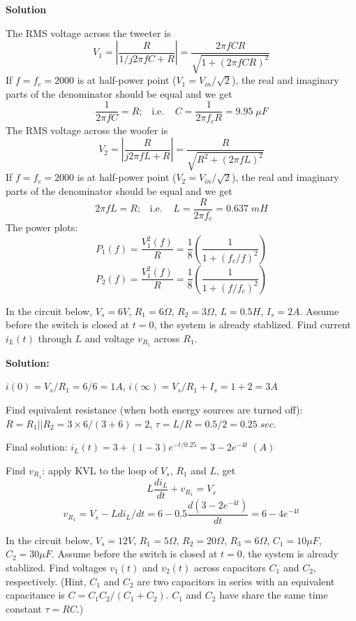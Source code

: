 \begin{enumerate}
   {\bf Solution}
   
   The RMS voltage across the tweeter is
   \[	V_1=|\frac{R}{1/j2\pi f C+R}|
   	=\frac{2\pi f CR}{\sqrt{1+(2\pi f CR)^2}}	\]
   If $f=f_c=2000$ is at half-power point ($V_1=V_{in}/\sqrt{2}$), the real and
   imaginary parts of the denominator should be equal and we get 
   \[	\frac{1}{2\pi f C}=R;\;\;\;\mbox{i.e.}\;\;\;\;
   	C=\frac{1}{2\pi f_c R}=9.95 \;\mu F	\]
  The RMS voltage across the woofer is
  \[	V_2=|\frac{R}{j2\pi f L+R}|
   	=\frac{R}{\sqrt{R^2+(2\pi f L)^2}}	\]
   If $f=f_c=2000$ is at half-power point ($V_2=V_{in}/\sqrt{2}$), the real and
   imaginary parts of the denominator should be equal and we get 
   \[	2\pi f L=R;\;\;\;\mbox{i.e.}\;\;\;\;
   	L=\frac{R}{2\pi f_c}=0.637 \;mH	\]
   The power plots:
   \[	P_1(f)=\frac{V_1^2(f)}{R}=\frac{1}{8}(\frac{1}{1+(f_c/f)^2}) \]
   \[	P_2(f)=\frac{V_1^2(f)}{R}=\frac{1}{8}(\frac{1}{1+(f/f_c)^2}) \]

\end{enumerate}


\item In the circuit below, $V_s=6V$, $R_1=6\Omega$, $R_2=3\Omega$,
$L=0.5H$, $I_s=2A$. Assume before the switch is closed at $t=0$, the
system is already stablized. Find current $i_L(t)$ through $L$ and 
voltage $v_{R_1}$ across $R_1$.


{\bf Solution:}

 $i(0)=V_s/R_1=6/6=1A$, $i(\infty)=V_s/R_1+I_s=1+2=3A$

 Find equivalent resistance (when both energy sources are turned off):
 $R=R_1 || R_2=3\times 6/(3+6)=2$, $\tau=L/R=0.5/2=0.25\;sec.$

 Final solution:
 $i_L(t)=3+(1-3)e^{-t/0.25}=3-2 e^{-4t} \; (A)$

 Find $v_{R_1}$: apply KVL to the loop of $V_s$, $R_1$ and $L$, get
 \[ L\frac{di_L}{dt}+v_{R_1}=V_s	\]
 \[ v_{R_1}=V_s-L di_L/dt=6-0.5 \frac{d(3-2 e^{-4t})}{dt}=6-4e^{-4t}	\]

\item In the circuit below, $V_s=12V$, $R_1=5\Omega$, $R_2=20\Omega$,
$R_3=6\Omega$, $C_1=10\mu F$, $C_2=30\mu F$. Assume before the switch 
is closed at $t=0$, the system is already stablized. Find voltages
$v_1(t)$ and $v_2(t)$ across capacitors $C_1$ and $C_2$, respectively.
(Hint, $C_1$ and $C_2$ are two capacitors in series with an equivalent
capacitance is $C=C_1 C_2/(C_1+C_2)$. $C_1$ and $C_2$ have share the same
time constant $\tau=RC$.)

